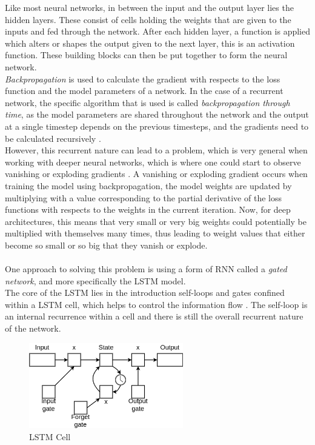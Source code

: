 \documentclass[main.tex]{subfiles}
\begin{document}
Like most neural networks, in between the input and the output layer lies the hidden layers. These consist of cells holding the weights that are given to the inputs and fed through the network. After each hidden layer, a function is applied which alters or shapes the output given to the next layer, this is an activation function. These building blocks can then be put together to form the neural network.
\\
\textit{Backpropagation} is used to calculate the gradient with respects to the loss function and the model parameters of a network. In the case of a recurrent network, the specific algorithm that is used is called \textit{backpropagation through time}, as the model parameters are shared throughout the network and the output at a single timestep depends on the previous timesteps, and the gradients need to be calculated recursively \cite{Goodfellow-et-al-2016}.\\
However, this recurrent nature can lead to a problem, which is very general when working with deeper neural networks, which is where one could start to observe vanishing or exploding gradients \cite{Goodfellow-et-al-2016}. A vanishing or exploding gradient occurs when training the model using backpropagation, the model weights are updated by multiplying with a value corresponding to the partial derivative of the loss functions with respects to the weights in the current iteration. Now, for deep architectures, this means that very small or very big weights could potentially be multiplied with themselves many times, thus leading to weight values that either become so small or so big that they vanish or explode\cite{Goodfellow-et-al-2016}.\\
\\
One approach to solving this problem is using a form of RNN called a \textit{gated network}, and more specifically the LSTM model.\\
The core of the LSTM lies in the introduction self-loops and gates confined within a LSTM cell, which helps to control the information flow \cite{Goodfellow-et-al-2016}. The self-loop is an internal recurrence within a cell and there is still the overall recurrent nature of the network. 

\begin{figure}[H]
\centering
\includegraphics[width=0.6\textwidth]{Figures/LSTMCell.png}
\caption{LSTM Cell}
\label{fig:LSTM Cell}
\end{figure}
\end{document}
